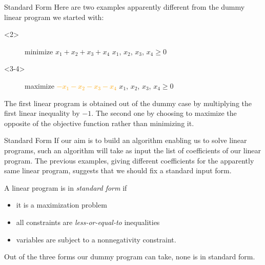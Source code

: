\documentclass[32pt, aspectratio = 169]{beamer}
\begin{document}
\begin{frame}{Standard Form}
  Here are two examples apparently different from the dummy linear
  program we started with:
    \begin{overlayarea}{\textwidth}{.5\textheight}
    \begin{onlyenv}<2>
    \begin{figure}
        \begin{linearProg}{
            minimize
            }{
            $x_1 + x_2 + x_3 + x_4$
            }{
            }{
            $x_1$, $x_2$, $x_3$, $x_4 \geq 0$
            }
        \end{linearProg}
    \end{figure}
    \end{onlyenv}
    \begin{onlyenv}<3-4>
        \vspace{-1em}
    \begin{figure}
        \begin{linearProg}{
            maximize
            }{
            \textcolor{orange}{$-x_1 - x_2 - x_3 - x_4$}
            }{
            }{
            $x_1$, $x_2$, $x_3$, $x_4 \geq 0$
            }
        \end{linearProg}
    \end{figure}
    \end{onlyenv}
    \end{overlayarea}
    \pause[4]
    The first linear program is obtained out of the dummy case by
    multiplying the first linear inequality by $-1$. The second one by
    choosing to maximize the opposite of the objective function rather
    than minimizing it.
\end{frame}

\begin{frame}{Standard Form}
  If our aim is to build an algorithm enabling us to solve linear
  programs, such an algorithm will take as input the list of
  coefficients of our linear program. The previous examples, giving
  different coefficients for the apparently same linear program,
  suggests that we should fix a standard input form.
    \begin{defn}
      A linear program is in \emph{standard form} if
      \begin{itemize}
      \item[\textbullet] it is a maximization problem
      \item[\textbullet] all constraints are \textit{less-or-equal-to}
        inequalities
      \item[\textbullet] variables are subject to a nonnegativity
        constraint.
      \end{itemize}
    \end{defn}
    Out of the three forms our dummy program can take, none is in
    standard form.
\end{frame}
\end{document}
